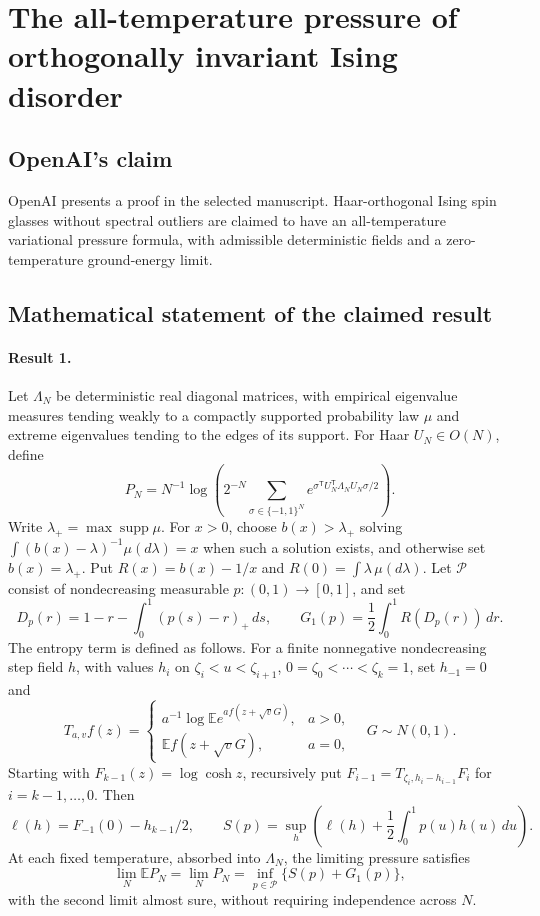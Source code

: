 \documentclass[11pt]{article}
\begin{document}
\section*{The all-temperature pressure of orthogonally invariant Ising disorder}

\subsection{OpenAI's claim}
OpenAI presents a proof in the selected manuscript. Haar-orthogonal Ising spin glasses without spectral outliers are claimed to have an all-temperature variational pressure formula, with admissible deterministic fields and a zero-temperature ground-energy limit.

\subsection{Mathematical statement of the claimed result}
\paragraph{Result 1.} Let $\Lambda_N$ be deterministic real diagonal matrices, with empirical eigenvalue measures tending weakly to a compactly supported probability law $\mu$ and extreme eigenvalues tending to the edges of its support. For Haar $U_N\in O(N)$, define
\[
 P_N=N^{-1}\log\left(2^{-N}\sum_{\sigma\in\{-1,1\}^N}
 e^{\sigma^{\mathsf T}U_N^{\mathsf T}\Lambda_NU_N\sigma/2}\right).
\]
Write $\lambda_+=\max\operatorname{supp}\mu$. For $x>0$, choose $b(x)>\lambda_+$ solving $\int(b(x)-\lambda)^{-1}\mu(d\lambda)=x$ when such a solution exists, and otherwise set $b(x)=\lambda_+$. Put $R(x)=b(x)-1/x$ and $R(0)=\int\lambda\,\mu(d\lambda)$. Let $\mathcal P$ consist of nondecreasing measurable $p:(0,1)\to[0,1]$, and set
\[
 D_p(r)=1-r-\int_0^1(p(s)-r)_+\,ds,\qquad
 G_1(p)=\frac12\int_0^1R(D_p(r))\,dr.
\]
The entropy term is defined as follows. For a finite nonnegative nondecreasing step field $h$, with values $h_i$ on $\zeta_i<u<\zeta_{i+1}$, $0=\zeta_0<\cdots<\zeta_k=1$, set $h_{-1}=0$ and
\[
 T_{a,v}f(z)=\begin{cases}a^{-1}\log\mathbb E e^{af(z+\sqrt vG)},&a>0,\\
 \mathbb Ef(z+\sqrt vG),&a=0,\end{cases}\quad G\sim N(0,1).
\]
Starting with $F_{k-1}(z)=\log\cosh z$, recursively put $F_{i-1}=T_{\zeta_i,h_i-h_{i-1}}F_i$ for $i=k-1,\ldots,0$. Then
\[
 \ell(h)=F_{-1}(0)-h_{k-1}/2,\qquad
 S(p)=\sup_h\left(\ell(h)+\frac12\int_0^1p(u)h(u)\,du\right).
\]
At each fixed temperature, absorbed into $\Lambda_N$, the limiting pressure satisfies
\[
 \lim_N\mathbb EP_N=\lim_NP_N=\inf_{p\in\mathcal P}\{S(p)+G_1(p)\},
\]
with the second limit almost sure, without requiring independence across $N$.
\end{document}
